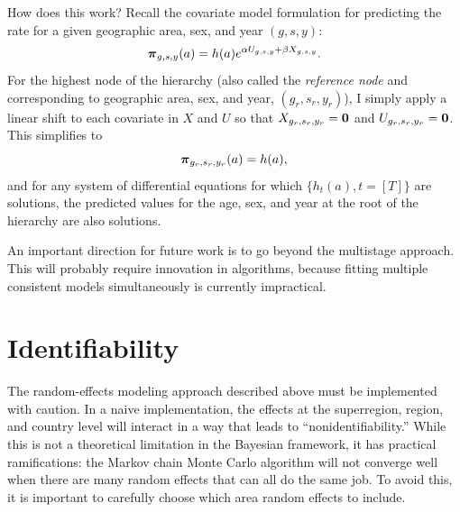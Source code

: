 How does this work?  Recall the covariate model formulation for
predicting the rate for a given geographic area, sex, and year $(g,s,y)$:
\[
{\boldsymbol{\pi}}_{g,s,y}(a) = h(a)e^{\alpha U_{g,s,y} + \beta X_{g,s,y}}.
\]
For the highest node of the hierarchy (also called the
\emph{reference node} and corresponding to geographic area, sex, and year, $(g_r, s_r,
y_r)$), I simply apply a linear shift to each covariate in $X$ and $U$
so that $X_{{g_r},{s_r},{y_r}} = \mathbf{0}$ and $U_{g_r,s_r,y_r} = \mathbf{0}$.  This
simplifies to \[ {\boldsymbol{\pi}}_{g_r,s_r,y_r}(a) = h(a), \] and for any system
of differential equations for which $\{h_t(a), t=[T]\}$ are
solutions, the predicted values for the age, sex, and year at the root of
the hierarchy are also solutions.

An important direction for future work is to go beyond the multistage
approach.  This will probably require innovation in algorithms,
because fitting multiple consistent models simultaneously is currently
impractical.

\section{Identifiability}
The random-effects modeling approach described above must be
implemented with caution.  In a naive implementation, the effects at
the superregion, region, and country level will interact in a way
that leads to ``nonidentifiability.''  While this is not a
theoretical limitation in the Bayesian framework, it has practical
ramifications: the Markov chain Monte Carlo algorithm will not converge well when there
are many random effects that can all do the same job.  To avoid this,
it is important to carefully choose which area random effects to include.

